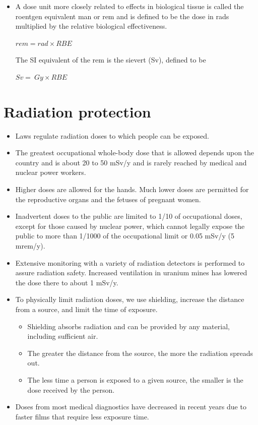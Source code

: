 \documentclass[12pt]{book}
\begin{document}
\begin{itemize}
\item A dose unit more closely related to effects in biological tissue is called the roentgen equivalent man or rem and is defined to be the dose in rads multiplied by the relative biological effectiveness.

$ rem = rad \times RBE$

The SI equivalent of the rem is the sievert (Sv), defined to be

$ Sv = \ Gy \times  RBE$



\end{itemize}

\chapter{Radiation protection}
\begin{itemize}
    \item  Laws regulate radiation doses to which people can be exposed.
    \item The greatest occupational whole-body dose that is allowed depends upon the country and is about 20 to 50 mSv/y and is rarely reached by medical and nuclear power workers.
    \item Higher doses are allowed for the hands. Much lower doses are permitted for the reproductive organs and the fetuses of pregnant women.
    \item Inadvertent doses to the public are limited to 1/10 of occupational doses, except for those caused by nuclear power, which cannot legally expose the public to more than 1/1000 of the occupational limit or 0.05 mSv/y (5 mrem/y).
    \item Extensive monitoring with a variety of radiation detectors is performed to assure radiation safety. Increased ventilation in uranium mines has lowered the dose there to about 1 mSv/y.

    \item To physically limit radiation doses, we use shielding, increase the distance from a source, and limit the time of exposure.
	\begin{itemize}
    \item  Shielding absorbs radiation and can be provided by any material, including sufficient air.
    \item The greater the distance from the source, the more the radiation spreads out.
    \item The less time a person is exposed to a given source, the smaller is the dose received by the person.

\end{itemize}
    \item Doses from most medical diagnostics have decreased in recent years due to faster films that require less exposure time.
\end{itemize}
\end{document}
